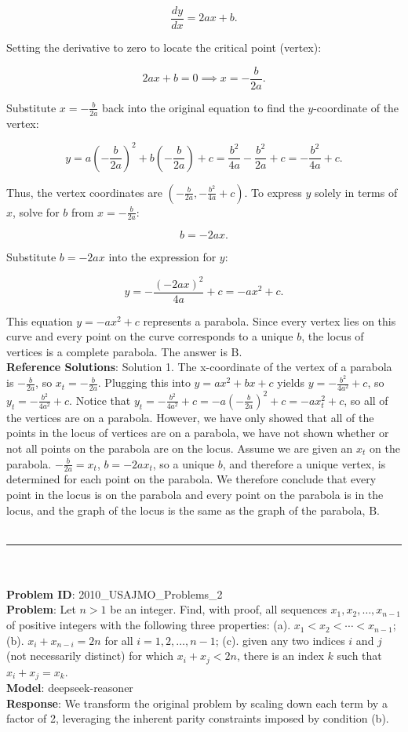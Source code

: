 {\[
\frac{dy}{dx} = 2ax + b.
\]

Setting the derivative to zero to locate the critical point (vertex):

\[
2ax + b = 0 \implies x = -\frac{b}{2a}.
\]

Substitute \( x = -\frac{b}{2a} \) back into the original equation to find the \( y \)-coordinate of the vertex:

\[
y = a\left(-\frac{b}{2a}\right)^2 + b\left(-\frac{b}{2a}\right) + c = \frac{b^2}{4a} - \frac{b^2}{2a} + c = -\frac{b^2}{4a} + c.
\]

Thus, the vertex coordinates are \( \left( -\frac{b}{2a}, -\frac{b^2}{4a} + c \right) \). To express \( y \) solely in terms of \( x \), solve for \( b \) from \( x = -\frac{b}{2a} \):

\[
b = -2ax.
\]

Substitute \( b = -2ax \) into the expression for \( y \):

\[
y = -\frac{(-2ax)^2}{4a} + c = -ax^2 + c.
\]

This equation \( y = -ax^2 + c \) represents a parabola. Since every vertex lies on this curve and every point on the curve corresponds to a unique \( b \), the locus of vertices is a complete parabola. The answer is \(\boxed{\text{B}}\). \\
    \textbf{Reference Solutions}: Solution 1. The x-coordinate of the vertex of a parabola is $-\frac{b}{2a}$, so $x_t=-\frac{b}{2a}$. Plugging this into $y=ax^2+bx+c$ yields $y=-\frac{b^2}{4a^2}+c$, so $y_t=-\frac{b^2}{4a^2}+c$. Notice that $y_t=-\frac{b^2}{4a^2}+c=-a(-\frac{b}{2a})^2+c=-ax_t^2+c$, so all of the vertices are on a parabola. However, we have only showed that all of the points in the locus of vertices are on a parabola, we have not shown whether or not all points on the parabola are on the locus. Assume we are given an $x_t$ on the parabola. $-\frac{b}{2a}=x_t$, $b=-2ax_t$, so a unique $b$, and therefore a unique vertex, is determined for each point on the parabola. We therefore conclude that every point in the locus is on the parabola and every point on the parabola is in the locus, and the graph of the locus is the same as the graph of the parabola, $\boxed{\text{B}}$. \\
    \vspace{0.3cm} \\
    \hrule \\
    \vspace{0.5cm} \\
    \textbf{Problem ID}: 2010_USAJMO_Problems_2 \\
    \textbf{Problem}: Let $n > 1$ be an integer. Find, with proof, all sequences
$x_1, x_2, \ldots, x_{n-1}$ of positive integers with the following
three properties:
(a). $x_1 < x_2 < \cdots < x_{n-1}$;
(b). $x_i + x_{n-i} = 2n$ for all $i=1,2,\ldots,n-1$;
(c). given any two indices $i$ and $j$ (not necessarily distinct) for which $x_i + x_j < 2n$, there is an index $k$ such that $x_i + x_j = x_k$. \\
    \textbf{Model}: deepseek-reasoner \\
    \textbf{Response}: We transform the original problem by scaling down each term by a factor of 2, leveraging the inherent parity constraints imposed by condition (b). 

}
